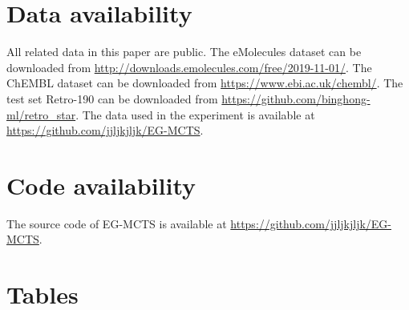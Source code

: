 \documentclass[sn-mathphys,Numbered]{sn-jnl}
\begin{document}
\section{Data availability}
All related data in this paper are public.
The eMolecules dataset can be downloaded from \url{http://downloads.emolecules.com/free/2019-11-01/}.
The ChEMBL dataset can be downloaded from \url{https://www.ebi.ac.uk/chembl/}.
The test set Retro-190 can be downloaded from \url{https://github.com/binghong-ml/retro_star}.
The data used in the experiment is available at \url{https://github.com/jjljkjljk/EG-MCTS}.

\section{Code availability}
The source code of EG-MCTS is available at \url{https://github.com/jjljkjljk/EG-MCTS}.









\backmatter






\section{Tables}
\end{document}
